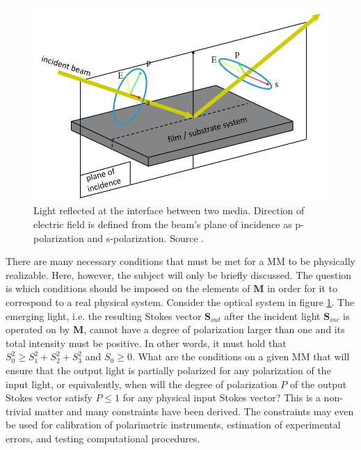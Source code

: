 \begin{figure}
    \centering
    \includegraphics[scale=0.75]{figures/Ch2/principle_of_ellipsometry.png}
    \caption{Light reflected at the interface between two media. Direction of electric field is defined from the beam's plane of incidence as p-polarization and s-polarization. Source \cite{ellipsometry_fig}.}
    \label{fig:principle_of_ellipsometry}
\end{figure}

There are many necessary conditions that must be met for a MM to be physically realizable\cite{hans_arwin}\cite{realizableMM}. Here, however, the subject will only be briefly discussed. The question is which conditions should be imposed on the elements of $\mathbf{M}$ in order for it to correspond to a real physical system. Consider the optical system in figure \ref{fig:principle_of_ellipsometry}. The emerging light, i.e. the resulting Stokes vector $\mathbf{S}_{out}$ after the incident light $\mathbf{S}_{inc}$ is operated on by $\mathbf{M}$, cannot have a degree of polarization larger than one and its total intensity must be positive. In other words, it must hold that $S_0^2 \geq S_1^2+S_2^2+S_3^2$ and $S_0 \geq 0$. What are the conditions on a given MM that will ensure that the output light is partially polarized for any polarization of the input light, or equivalently, when will the degree of polarization $P$ of the output Stokes vector satisfy $P\leq1$ for any physical input Stokes vector? This is a non-trivial matter and many constraints have been derived\cite{realizableMM}\cite{Kostinski:93}. The constraints may even be used for calibration of polarimetric instruments, estimation of experimental errors, and testing computational procedures.

